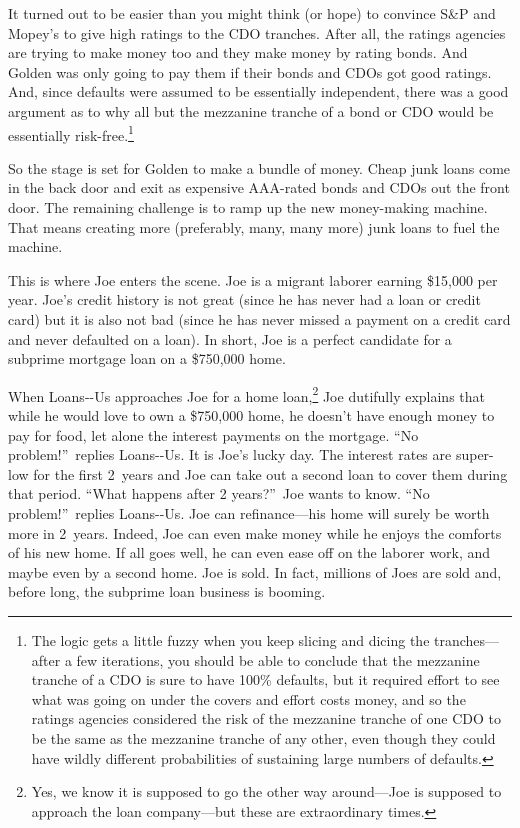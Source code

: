 It turned out to be easier than you might think (or hope) to convince
S\&P and Mopey's to give high ratings to the CDO tranches.  After all,
the ratings agencies are trying to make money too and they make money
by rating bonds.  And Golden was only going to pay them if their bonds
and CDOs got good ratings.  And, since defaults were assumed to be
essentially independent, there was a good argument as to why all but
the mezzanine tranche of a bond or CDO would be essentially
risk-free.\footnote{The logic gets a little fuzzy when you keep
  slicing and dicing the tranches---after a few iterations, you should
  be able to conclude that the mezzanine tranche of a CDO is sure to
  have 100\% defaults, but it required effort to see what was going on
  under the covers and effort costs money, and so the ratings agencies
  considered the risk of the mezzanine tranche of one CDO to be the
  same as the mezzanine tranche of any other, even though they could
  have wildly different probabilities of sustaining large numbers of
  defaults.}

So the stage is set for Golden to make a bundle of money.  Cheap
junk loans come in the back door and exit as expensive AAA-rated
bonds and CDOs out the front door.  The remaining challenge is to ramp
up the new money-making machine.  That means creating more
(preferably, many, many more) junk loans to fuel the machine.

This is where Joe enters the scene.  Joe is a migrant laborer earning
\$15,000 per year.  Joe's credit history is not great (since he has
never had a loan or credit card) but it is also not bad (since he has
never missed a payment on a credit card and never defaulted on a
loan).  In short, Joe is a perfect candidate for a subprime mortgage
loan on a \$750,000 home.

When Loans--Us approaches Joe for a home
loan,\footnote{Yes, we know it is supposed to go the other way
  around---Joe is supposed to approach the loan company---but these
  are extraordinary times.} Joe dutifully explains that while he would
love to own a \$750,000 home, he doesn't have enough money to pay for
food, let alone the interest payments on the mortgage.  ``No
problem!''\ replies Loans--Us.  It is Joe's lucky day.
The interest rates are super-low for the first 2~years and Joe can
take out a second loan to cover them during that period.  ``What
happens after 2 years?''\ Joe wants to know.  ``No problem!''\ replies
Loans--Us.  Joe can refinance---his home will surely be
worth more in 2~years.  Indeed, Joe can even make money while he
enjoys the comforts of his new home.  If all goes well, he can even
ease off on the laborer work, and maybe even by a second home.  Joe is
sold.  In fact, millions of Joes are sold and, before long, the
subprime loan business is booming.

